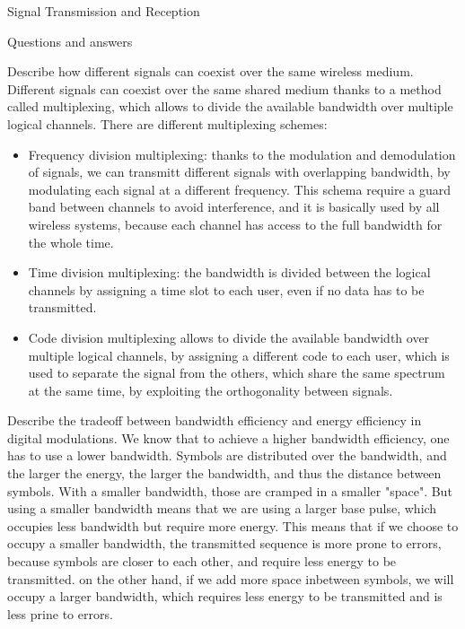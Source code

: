 \begin{section}{Signal Transmission and Reception}
\begin{section}{Questions and answers}
    \begin{subsubsection}{Describe how different signals can coexist over the same wireless medium.}
      Different signals can coexist over the same shared medium thanks to a method called
      multiplexing, which allows to divide the available bandwidth over multiple logical channels.
      There are different multiplexing schemes:
      \begin{itemize}
        \item Frequency division multiplexing: thanks to the modulation and demodulation of signals,
          we can transmitt different signals with overlapping bandwidth, by modulating each signal
          at a different frequency. This schema require a guard band between channels to avoid
          interference, and it is basically used by all wireless systems, because each channel has
          access to the full bandwidth for the whole time.
        \item Time division multiplexing: the bandwidth is divided between the logical channels 
          by assigning a time slot to each user, even if no data has to be transmitted.
        \item Code division multiplexing allows to divide the available bandwidth over multiple
          logical channels, by assigning a different code to each user, which is used to separate
          the signal from the others, which share the same spectrum at the same time, by exploiting
          the orthogonality between signals.
      \end{itemize}
    \end{subsubsection}

    \begin{subsubsection}{Describe the tradeoff between bandwidth efficiency and energy efficiency
      in digital modulations.}
      We know that to achieve a higher bandwidth efficiency, one has to use a lower bandwidth. 
      Symbols are distributed over the bandwidth, and the larger the energy, the larger
      the bandwidth, and thus the distance between symbols. With a smaller bandwidth, those are
      cramped in a smaller "space". But using a smaller bandwidth means that we are using a larger
      base pulse, which occupies less bandwidth but require more energy. This means that if we
      choose to occupy a smaller bandwidth, the transmitted sequence is more prone to errors,
      because symbols are closer to each other, and require less energy to be transmitted. on the
      other hand, if we add more space inbetween symbols, we will occupy a larger bandwidth, which
      requires less energy to be transmitted and is less prine to errors.
    \end{subsubsection}

  \end{section}
\end{section}
